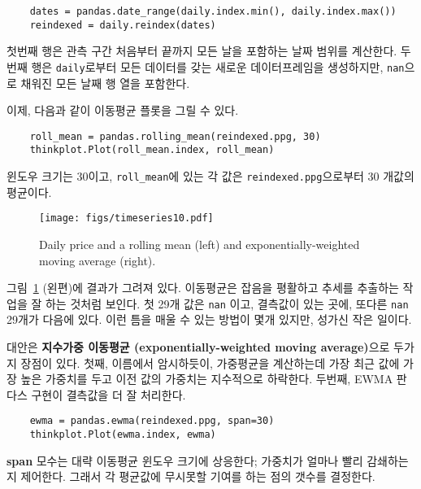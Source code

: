 \begin{verbatim}
    dates = pandas.date_range(daily.index.min(), daily.index.max())
    reindexed = daily.reindex(dates)
\end{verbatim}

첫번째 행은 관측 구간 처음부터 끝까지 모든 날을 포함하는 날짜 범위를 계산한다. 두번째 행은 {\tt daily}로부터 모든 데이터를 갖는 새로운 데이터프레임을 생성하지만, {\tt nan}으로 채워진 모든 날째 행 열을 포함한다.


이제, 다음과 같이 이동평균 플롯을 그릴 수 있다.

\begin{verbatim}
    roll_mean = pandas.rolling_mean(reindexed.ppg, 30)
    thinkplot.Plot(roll_mean.index, roll_mean)
\end{verbatim}

윈도우 크기는 30이고, \verb"roll_mean"에 있는 각 값은 {\tt reindexed.ppg}으로부터 30 개값의 평균이다.


\begin{figure}
\centerline{\texttt{[image: figs/timeseries10.pdf]}}
\caption{Daily price and a rolling mean (left) and exponentially-weighted
moving average (right).}
\label{timeseries10}
\end{figure}

그림~\ref{timeseries10} (왼편)에 결과가 그려져 있다.
이동평균은 잡음을 평활하고 추세를 추출하는 작업을 잘 하는 것처럼 보인다. 
첫 29개 값은 {\tt nan} 이고, 결측값이 있는 곳에, 또다른 {\tt nan} 29개가 다음에 있다. 이런 틈을 매울 수 있는 방법이 몇개 있지만, 성가신 작은 일이다.

대안은 {\bf 지수가중 이동평균 (exponentially-weighted moving average)}으로 두가지 장점이 있다. 첫째, 이름에서 암시하듯이, 가중평균을 계산하는데 가장 최근 값에 가장 높은 가중치를 두고 이전 값의 가중치는 지수적으로 하락한다. 두번째, EWMA 판다스 구현이 결측값을 더 잘 처리한다.

\begin{verbatim}
    ewma = pandas.ewma(reindexed.ppg, span=30)
    thinkplot.Plot(ewma.index, ewma)
\end{verbatim}

{\bf span} 모수는 대략 이동평균 윈도우 크기에 상응한다; 가중치가 얼마나 빨리 감쇄하는지 제어한다. 그래서 각 평균값에 무시못할 기여를 하는 점의 갯수를 결정한다.

